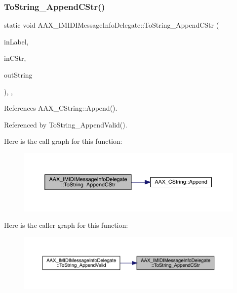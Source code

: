 \subsubsection{\texorpdfstring{ToString\_AppendCStr()}{ToString\_AppendCStr()}}
{\footnotesize\ttfamily static void A\+A\+X\+\_\+\+I\+M\+I\+D\+I\+Message\+Info\+Delegate\+::\+To\+String\+\_\+\+Append\+C\+Str (\begin{DoxyParamCaption}\item[{const char $\ast$}]{in\+Label,  }\item[{const char $\ast$}]{in\+C\+Str,  }\item[{\mbox{\hyperlink{a01573}{A\+A\+X\+\_\+\+C\+String}} \&}]{out\+String }\end{DoxyParamCaption})\hspace{0.3cm}{\ttfamily [inline]}, {\ttfamily [static]}, {\ttfamily [protected]}}



References A\+A\+X\+\_\+\+C\+String\+::\+Append().



Referenced by To\+String\+\_\+\+Append\+Valid().

Here is the call graph for this function\+:
\nopagebreak
\begin{figure}[H]
\begin{center}
\leavevmode
\includegraphics[width=350pt]{a01953_a020ec843c8ec267a5afa66415c3df95a_cgraph}
\end{center}
\end{figure}
Here is the caller graph for this function\+:
\nopagebreak
\begin{figure}[H]
\begin{center}
\leavevmode
\includegraphics[width=350pt]{a01953_a020ec843c8ec267a5afa66415c3df95a_icgraph}
\end{center}
\end{figure}
\mbox{\label{a01953_a459b5e82caa345b2d0e4f80d3d2a0a0b}} 

